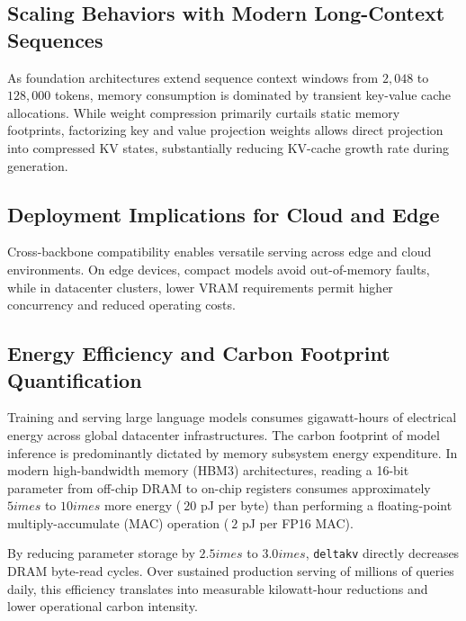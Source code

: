 \subsection{Scaling Behaviors with Modern Long-Context Sequences}
As foundation architectures extend sequence context windows from $2{,}048$ to $128{,}000$ tokens, memory consumption is dominated by transient key-value cache allocations. While weight compression primarily curtails static memory footprints, factorizing key and value projection weights allows direct projection into compressed KV states, substantially reducing KV-cache growth rate during generation.

\subsection{Deployment Implications for Cloud and Edge}
Cross-backbone compatibility enables versatile serving across edge and cloud environments. On edge devices, compact models avoid out-of-memory faults, while in datacenter clusters, lower VRAM requirements permit higher concurrency and reduced operating costs.

\subsection{Energy Efficiency and Carbon Footprint Quantification}
Training and serving large language models consumes gigawatt-hours of electrical energy across global datacenter infrastructures. The carbon footprint of model inference is predominantly dictated by memory subsystem energy expenditure. In modern high-bandwidth memory (HBM3) architectures, reading a 16-bit parameter from off-chip DRAM to on-chip registers consumes approximately $5	imes$ to $10	imes$ more energy ($~20$ pJ per byte) than performing a floating-point multiply-accumulate (MAC) operation ($~2$ pJ per FP16 MAC).

By reducing parameter storage by $2.5	imes$ to $3.0	imes$, \texttt{deltakv} directly decreases DRAM byte-read cycles. Over sustained production serving of millions of queries daily, this efficiency translates into measurable kilowatt-hour reductions and lower operational carbon intensity.
